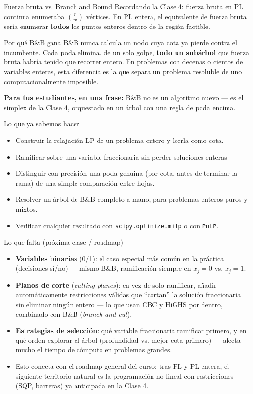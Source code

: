 \documentclass[aspectratio=169]{beamer}
\begin{document}
\begin{frame}{Fuerza bruta vs. Branch and Bound}
Recordando la Clase 4: fuerza bruta en PL continua enumeraba $\binom{n}{m}$ vértices. En PL entera, el equivalente de fuerza bruta sería enumerar \textbf{todos} los puntos enteros dentro de la región factible.

\begin{block}{Por qué B\&B gana}
B\&B nunca calcula un nodo cuya cota ya pierde contra el incumbente. Cada poda elimina, de un solo golpe, \textbf{todo un subárbol} que fuerza bruta habría tenido que recorrer entero. En problemas con decenas o cientos de variables enteras, esta diferencia es la que separa un problema resoluble de uno computacionalmente imposible.
\end{block}

\textbf{Para tus estudiantes, en una frase:} B\&B no es un algoritmo nuevo --- es el simplex de la Clase 4, orquestado en un árbol con una regla de poda encima.
\end{frame}

\begin{frame}{Lo que ya sabemos hacer}
\begin{itemize}
\item Construir la relajación LP de un problema entero y leerla como cota.
\item Ramificar sobre una variable fraccionaria sin perder soluciones enteras.
\item Distinguir con precisión una poda genuina (por cota, antes de terminar la rama) de una simple comparación entre hojas.
\item Resolver un árbol de B\&B completo a mano, para problemas enteros puros y mixtos.
\item Verificar cualquier resultado con \texttt{scipy.optimize.milp} o con \texttt{PuLP}.
\end{itemize}
\end{frame}

\begin{frame}{Lo que falta (próxima clase / roadmap)}
\begin{itemize}
\item \textbf{Variables binarias} (0/1): el caso especial más común en la práctica (decisiones sí/no) --- mismo B\&B, ramificación siempre en $x_j=0$ vs. $x_j=1$.
\item \textbf{Planos de corte} (\emph{cutting planes}): en vez de solo ramificar, añadir automáticamente restricciones válidas que ``cortan'' la solución fraccionaria sin eliminar ningún entero --- lo que usan CBC y HiGHS por dentro, combinado con B\&B (\emph{branch and cut}).
\item \textbf{Estrategias de selección}: qué variable fraccionaria ramificar primero, y en qué orden explorar el árbol (profundidad vs. mejor cota primero) --- afecta mucho el tiempo de cómputo en problemas grandes.
\item Esto conecta con el roadmap general del curso: tras PL y PL entera, el siguiente territorio natural es la programación no lineal con restricciones (SQP, barreras) ya anticipada en la Clase 4.
\end{itemize}
\end{frame}
\end{document}
